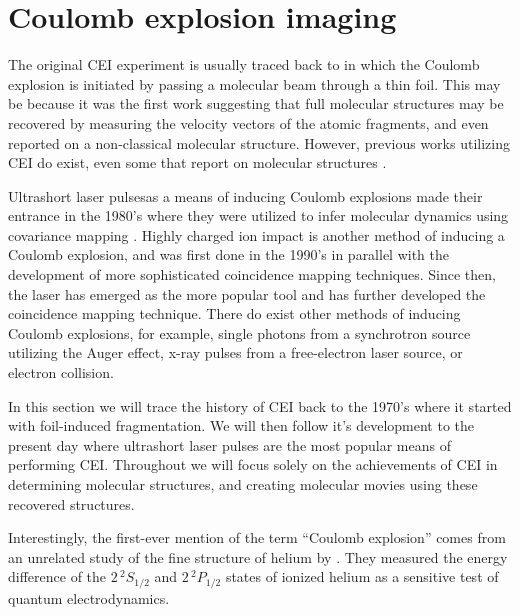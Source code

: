 \section{Coulomb explosion imaging}
The original CEI experiment is usually traced back to \citet{Vager89} in which the Coulomb explosion is initiated by passing a molecular beam through a thin foil. This may be because it was the first work suggesting that full molecular structures may be recovered by measuring the velocity vectors of the atomic fragments, and even reported on a non-classical molecular structure. However, previous works utilizing CEI do exist, even some that report on molecular structures \citep{Kanter79}.

Ultrashort laser pulses\footnotemark as a means of inducing Coulomb explosions made their entrance in the 1980's where they were utilized to infer molecular dynamics using covariance mapping \citep{Frasinski89}. Highly charged ion impact is another method of inducing a Coulomb explosion, and was first done in the 1990's in parallel with the development of more sophisticated coincidence mapping techniques. Since then, the laser has emerged as the more popular tool and has further developed the coincidence mapping technique. There do exist other methods of inducing Coulomb explosions, for example, single photons from a synchrotron source utilizing the Auger effect, x-ray pulses from a free-electron laser source, or electron collision.


In this section we will trace the history of CEI back to the 1970's where it started with foil-induced fragmentation. We will then follow it's development to the present day where ultrashort laser pulses are the most popular means of performing CEI. Throughout we will focus solely on the achievements of CEI in determining molecular structures, and creating molecular movies using these recovered structures\footnotemark.


Interestingly, the first-ever mention of the term ``Coulomb explosion'' comes from an unrelated study of the fine structure of helium by \citet{Novick55}. They measured the energy difference of the $2 \, ^2 S_{1/2}$ and $2 \, ^2 P_{1/2}$ states of ionized helium as a sensitive test of quantum electrodynamics.

